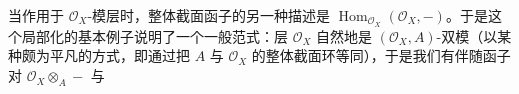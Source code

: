 当作用于 $\mathcal O_X$-模层时，整体截面函子的另一种描述是 $\operatorname{Hom}_{\mathcal O_X}(\mathcal O_X,-)$。于是这个局部化的基本例子说明了一个一般范式：层 $\mathcal O_X$ 自然地是 $(\mathcal O_X,A)$-双模（以某种颇为平凡的方式，即通过把 $A$ 与 $\mathcal O_X$ 的整体截面环等同），于是我们有伴随函子对 $\mathcal O_X\otimes_A-$ 与

